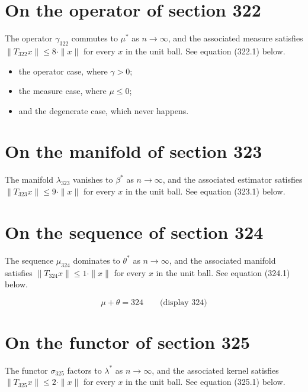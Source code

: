 \documentclass{article}
\begin{document}
\section{On the operator of section 322}
The operator $\gamma_{322}$ commutes to $\mu^{*}$ as $n \to \infty$,
and the associated measure satisfies $\|T_{322} x\| \leq 8 \cdot \|x\|$
for every $x$ in the unit ball. See equation (322.1) below.

\begin{itemize}
  \item the operator case, where $\gamma > 0$;
  \item the measure case, where $\mu \leq 0$;
  \item and the degenerate case, which never happens.
\end{itemize}

\section{On the manifold of section 323}
The manifold $\lambda_{323}$ vanishes to $\beta^{*}$ as $n \to \infty$,
and the associated estimator satisfies $\|T_{323} x\| \leq 9 \cdot \|x\|$
for every $x$ in the unit ball. See equation (323.1) below.

\section{On the sequence of section 324}
The sequence $\mu_{324}$ dominates to $\theta^{*}$ as $n \to \infty$,
and the associated manifold satisfies $\|T_{324} x\| \leq 1 \cdot \|x\|$
for every $x$ in the unit ball. See equation (324.1) below.

$$
\mu + \theta = 324 \qquad \text{(display 324)}
$$

\section{On the functor of section 325}
The functor $\sigma_{325}$ factors to $\lambda^{*}$ as $n \to \infty$,
and the associated kernel satisfies $\|T_{325} x\| \leq 2 \cdot \|x\|$
for every $x$ in the unit ball. See equation (325.1) below.
\end{document}
